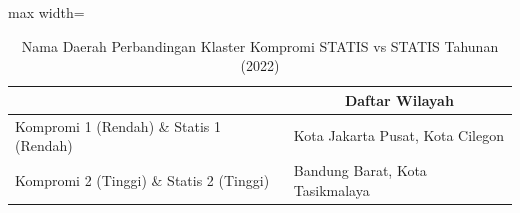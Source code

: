 \begin{table}[H]
\centering
\caption{Nama Daerah Perbandingan Klaster Kompromi STATIS vs STATIS Tahunan (2022)} \label{tab:sample1comp_statis_name_2022}
\begin{adjustbox}{max width=\textwidth}
\begin{tabular}{|>{\centering\arraybackslash}p{4cm}|p{10cm}|}
\hline
\multicolumn{1}{|c|}{\textbf{Kategori}} & \multicolumn{1}{c|}{\textbf{Daftar Wilayah}} \\
\hline
Kompromi 1 (Rendah) \& Statis 1 (Rendah) & Kota Jakarta Pusat, Kota Cilegon \\
\hline
Kompromi 2 (Tinggi) \& Statis 2 (Tinggi) & Bandung Barat, Kota Tasikmalaya \\
\hline
\end{tabular}
\end{adjustbox}
\end{table}